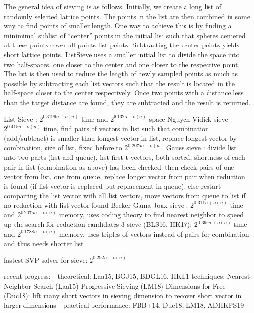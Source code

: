 {The general idea of sieving is as follows. Initially, we create a long list of randomly selected lattice points. The points in the list are then combined in some way to find points of smaller length. One way to achieve this is by finding a minimimal sublist of ``center'' points in the initial list such that spheres centered at these points cover all points list points. Subtracting the center points yields short lattice points. ListSieve \cite{MV10} uses a smaller initial list to divide the space into two half-spaces, one closer to the center and one closer to the respective point. The list is then used to reduce the length of newly sampled points as much as possible by subtracting each list vectors such that the result is located in the half-space closer to the center respectively. Once two points with a distance less than the target distance are found, they are subtracted and the result is returned. 

List Sieve \cite{MV10}: $2^{0.3199n + o(n)}$ time and $2^{0.1325 + o(n)}$ space
Nguyen-Vidick sieve \cite{NV08, ADHKPS19}: $2^{0.415n + o(n)}$ time, find pairs of vectors in list such that combination (add/subtract) is smaller than longest vector in list, replace longest vector by combination, size of list, fixed before to $2^{0.2075n + o(n)}$
Gauss sieve \cite{MV10}: divide list into two parts (list and queue), list first t vectors, both sorted, shortness of each pair in list (combination as above) has been checked, then check pairs of one vector from list, one from queue, replace longer vector from pair when reduction is found (if list vector is replaced put replacement in queue), else restart compairing the list vector with all list vectors, move vectors from queue to list if no reduction with list vector found
Becker-Gama-Joux sieve \cite{BGJ15}: $2^{0.311n + o(n)}$ time and $2^{0.2075n + o(n)}$ memory, uses coding theory to find nearest neighbor to speed up the search for reduction candidates
3-sieve (BLS16, HK17): $2^{0.396n + o(n)}$ time and $2^{0.1788n + o(n)}$ memory, uses triples of vectors instead of pairs for combination and thus needs shorter list

fastest SVP solver for sieve: $2^{0.292n + o(n)}$ \cite{BDGL16}

recent progress: %
- theoretical: Laa15, BGJ15, BDGL16, HKL1
  techniques: 
    Nearest Neighbor Search (Laa15)
    Progressive Sieving (LM18)
    Dimensions for Free (Duc18): lift many short vectors in sieving dimension to recover short vector in larger dimensions
- practical performance: FBB+14, Duc18, LM18, ADHKPS19


}

